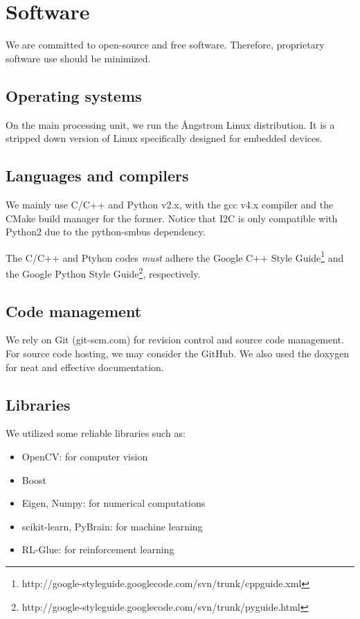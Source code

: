 \documentclass[a4paper, 10pt, twocolumn, titlepage]{article}
\begin{document}
\section{Software}
We are committed to open-source and free software.
Therefore, proprietary software use should be minimized.

\subsection{Operating systems}
On the main processing unit, we run the \AA ngstrom Linux distribution.
It is a stripped down version of Linux specifically designed for embedded devices.

\subsection{Languages and compilers}
We mainly use C/C++ and Python v2.x, with the gcc v4.x compiler and the CMake build manager for the former.
Notice that I2C  is only compatible with Python2 due to the python-smbus dependency.

The C/C++ and Ptyhon codes \emph{must} adhere the Google C++ Style Guide\footnote{http://google-styleguide.googlecode.com/svn/trunk/cppguide.xml}
 and the Google Python Style Guide\footnote{http://google-styleguide.googlecode.com/svn/trunk/pyguide.html}, respectively.
 
\subsection{Code management}
We rely on Git (\mbox{git-scm.com}) for revision control and source code management.
For source code hosting, we may consider the GitHub.
We also used the doxygen for neat and effective documentation.

\subsection{Libraries}
We utilized some reliable libraries such as:
\begin{itemize}
\itemsep-1mm
  \item OpenCV: for computer vision
  \item Boost
  \item Eigen, Numpy: for numerical computations
  \item scikit-learn, PyBrain: for machine learning
  \item RL-Glue: for reinforcement learning
\end{itemize}
\end{document}
